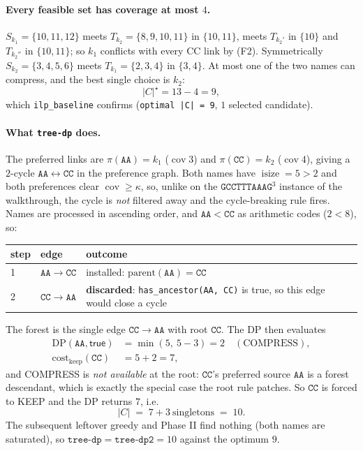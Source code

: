 \documentclass[11pt,a4paper]{article}
\theoremstyle{definition}
\theoremstyle{plain}
\theoremstyle{remark}
\newcommand{\cov}{\operatorname{cov}}
\newcommand{\isize}{\operatorname{isize}}
\begin{document}
\paragraph{Every feasible set has coverage at most $4$.}
$S_{k_1} = \{10,11,12\}$ meets $T_{k_2} = \{8,9,10,11\}$ in $\{10,11\}$,
meets $T_{k_2'}$ in $\{10\}$ and $T_{k_2''}$ in $\{10,11\}$; so $k_1$
conflicts with every CC link by (F2). Symmetrically
$S_{k_2} = \{3,4,5,6\}$ meets $T_{k_1} = \{2,3,4\}$ in $\{3,4\}$. At most
one of the two names can compress, and the best single choice is $k_2$:
\[
  |C|^\star = 13 - 4 = 9,
\]
which \texttt{ilp\_baseline} confirms (\texttt{optimal |C| = 9},
$1$ selected candidate).

\paragraph{What \texttt{tree-dp} does.}
The preferred links are
$\pi(\mathtt{AA}) = k_1$ ($\cov 3$) and $\pi(\mathtt{CC}) = k_2$
($\cov 4$), giving a $2$-cycle
$\mathtt{AA} \leftrightarrow \mathtt{CC}$ in the preference graph. Both
names have $\isize = 5 > 2$ and both preferences clear $\cov \ge \kappa$,
so, unlike on the $\mathtt{GCCTTTAAAG}^3$ instance of the walkthrough,
the cycle is \emph{not} filtered away and the cycle-breaking rule fires.
Names are processed in ascending order, and $\mathtt{AA} < \mathtt{CC}$
as arithmetic codes ($2 < 8$), so:

\begin{center}
\small
\begin{tabular}{@{}llp{9.2cm}@{}}
\toprule
step & edge & outcome \\
\midrule
1 & $\mathtt{AA} \to \mathtt{CC}$ &
  installed: $\mathrm{parent}(\mathtt{AA}) = \mathtt{CC}$ \\
2 & $\mathtt{CC} \to \mathtt{AA}$ &
  \textbf{discarded}: \texttt{has\_ancestor(AA,\,CC)} is true, so this
  edge would close a cycle \\
\bottomrule
\end{tabular}
\end{center}

The forest is the single edge $\mathtt{CC} \to \mathtt{AA}$ with root
$\mathtt{CC}$. The DP then evaluates
\[
\begin{aligned}
  \mathrm{DP}(\mathtt{AA},\mathsf{true}) &= \min(5,\ 5-3) = 2 \quad(\text{COMPRESS}),\\
  \mathrm{cost}_{\mathrm{keep}}(\mathtt{CC}) &= 5 + 2 = 7,
\end{aligned}
\]
and COMPRESS is \emph{not available} at the root: $\mathtt{CC}$'s
preferred source $\mathtt{AA}$ is a forest descendant, which is exactly
the special case the root rule patches. So $\mathtt{CC}$ is forced to
KEEP and the DP returns $7$, i.e.
\[
  |C| \;=\; 7 + 3\ \text{singletons} \;=\; 10 .
\]
The subsequent leftover greedy and Phase II find nothing (both names are
saturated), so $\texttt{tree-dp} = \texttt{tree-dp2} = 10$ against the
optimum $9$.
\end{document}
